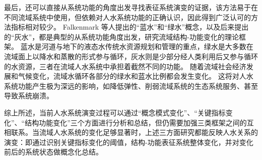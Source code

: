最后，还可以直接从系统功能的角度出发寻找表征系统演变的证据，该方法易于在不同流域系统中使用，但依赖对人水系统功能的正确认识，因此得到广泛认可的方法指标相对较少。
Falkenmark 等人提出的“蓝水”和“绿水”概念\cite{falkenmark2006}，以及后来提出的“灰水”，都是典型的从系统功能角度出发，研究流域结构-功能变化的理论框架\cite{mekonnen2011}。
蓝水是河道与地下的液态水传统水资源规划和管理的重点，绿水是大多数在流域面上以降水和蒸散的形式参与循环，灰水则是少部分经人类利用后又参与循环的水资源，三者在流域人水系统中承担着截然不同的功能\cite{craswell2007}。
随着流域社会经济发展和气候变化，流域水循环各部分的绿水和蓝水比例都会发生变化。
这将对人水系统功能产生极为深远的影响，如降低弹性、削弱流域系统的生态系统服务、甚至导致系统崩溃\cite{falkenmark2019}。

综上所述，当前人水系统演变过程可以通过“概念模式变化”、“关键指标变化”、“结构功能变化”三个方面进行分析和总结，但仍需要加强三类框架之间的互相联系。当流域人水系统的变化足够显著时，上述三方面研究都能反映人水关系的演变：即通过识别关键指标变化的阈值，结构-功能表征系统整体变化，并对变化前后的系统状态做概念化总结。
